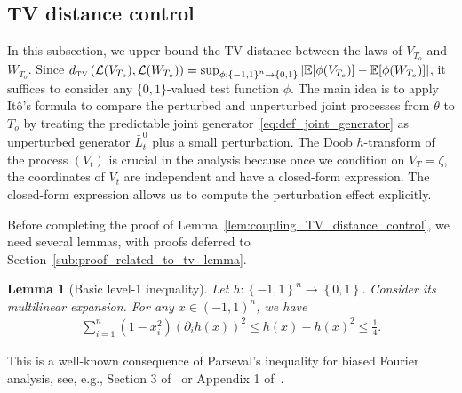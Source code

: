 \documentclass[11pt]{article}
\newcommand{\uV}{V}
\newcommand{\uW}{W}
\newcommand{\To}{{T_o}}
\newcommand{\jL}{\bar{L}}
\theoremstyle{named}
\theoremstyle{plain}
\newtheorem{lemma}{Lemma}
\newcommand{\Exs}{\ensuremath{{\mathbb{E}}}}
\newcommand{\Law}{\mathcal{L}}
\newcommand{\tvdist}[2]{\ensuremath{ d_{\text{\tiny{TV}}}\parenth{#1, #2} }}
\newcommand{\parenth}[1]{\left( #1 \right)}
\newcommand{\braces}[1]{\left\{ #1 \right \}}
\newcommand{\abss}[1]{\left| #1 \right |}
\begin{document}
\subsection{TV distance control}
\label{sub:proof_lem:coupling_TV_distance_control}

In this subsection, we upper-bound the TV distance between the laws of $\uV_{\To}$ and $\uW_{\To}$. Since $\tvdist{\Law(\uV_{\To})}{\Law(\uW_{\To})} = \sup_{\phi: \braces{-1,1}^n \to \braces{0, 1}} \abss{\Exs[ \phi(\uV_{\To} )] - \Exs[\phi(\uW_{\To})]}$, it suffices to consider any $\{0,1\}$-valued test function $\phi$. The main idea is to apply It\^o's formula to compare the perturbed and unperturbed joint processes from $\theta$ to $\To$ by treating the predictable joint generator~\eqref{eq:def_joint_generator} as unperturbed generator $\jL^0_t$ plus a small perturbation. The Doob $h$-transform of the process $(\uV_t)$ is crucial in the analysis because once we condition on $\uV_T = \zeta$, the coordinates of $\uV_t$ are independent and have a closed-form expression. The closed-form expression allows us to compute the perturbation effect explicitly.

Before completing the proof of Lemma~\ref{lem:coupling_TV_distance_control}, we need several lemmas, with proofs deferred to Section~\ref{sub:proof_related_to_tv_lemma}.


\begin{lemma}[Basic level-1 inequality]
  \label{lem:level_1_ineq}
  Let $h: \braces{-1,1}^n \to \braces{0, 1}$. Consider its multilinear expansion. For any $x \in (-1,1)^n$, we have
  \begin{align*}
    \sum_{i=1}^n (1-x_i^2) \parenth{\partial_i h(x)}^2 \leq h(x) - h(x)^2 \leq \frac14. 
  \end{align*}
\end{lemma}
This is a well-known consequence of Parseval's inequality for biased Fourier analysis, see, e.g., Section 3 of~\cite{eldan2023noise} or Appendix 1 of~\cite{eldan2020concentration}. 
\end{document}
